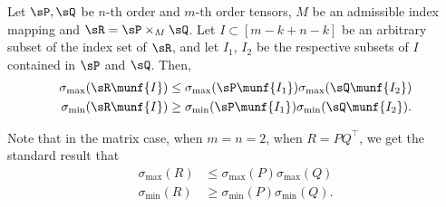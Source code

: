 \begin{lemma}
  \label{lem:tensor-multiplication}
Let $\sP, \sQ$ be $n$-th order and $m$-th order tensors, $M$ be an
  admissible index mapping and $\sR = \sP \times_M \sQ$. 
Let $I \subset [m - k + n - k]$ be an arbitrary subset of the index set
  of $\sR$,
and let $I_1$, $I_2$ be the respective subsets of $I$ contained in $\sP$
  and $\sQ$.
Then,
\begin{align*}
\sigma_{\max}(\sR\munf{I}) &\le \sigma_{\max}(\sP\munf{I_1}) \sigma_{\max}(\sQ\munf{I_2}) \\
\sigma_{\min}(\sR\munf{I}) &\ge \sigma_{\min}(\sP\munf{I_1}) \sigma_{\min}(\sQ\munf{I_2}).
\end{align*}
\end{lemma}

Note that in the matrix case, when $m = n = 2$, when $R = P Q^\top$, we get the standard result that 
\begin{align}
\sigma_{\max}(R) &\le \sigma_{\max}(P) \sigma_{\max}(Q) \\
\sigma_{\min}(R) &\ge \sigma_{\min}(P) \sigma_{\min}(Q) \label{eqn:matrix-singular}.
\end{align}

